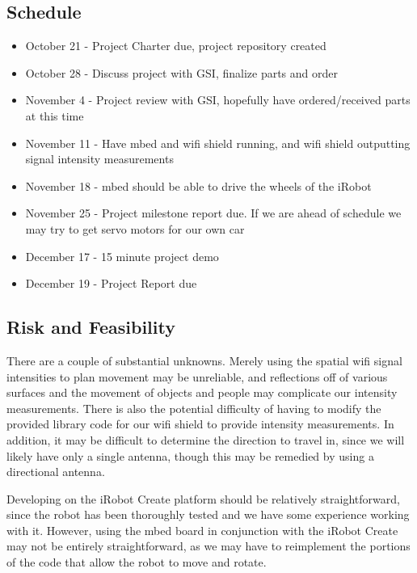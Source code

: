 \documentclass[letterpaper]{article}
\begin{document}
\subsection*{Schedule}

\begin{itemize}
\item October 21 - Project Charter due, project repository created
\item October 28 - Discuss project with GSI, finalize parts and order
\item November 4 - Project review with GSI, hopefully have ordered/received parts at this time
\item November 11 - Have mbed and wifi shield running, and wifi shield outputting signal intensity measurements
\item November 18 - mbed should be able to drive the wheels of the iRobot
\item November 25 - Project milestone report due. If we are ahead of schedule we may try to get servo motors for our own car
\item December 17 - 15 minute project demo
\item December 19 - Project Report due
\end{itemize}

\subsection*{Risk and Feasibility}

There are a couple of substantial unknowns. Merely using the spatial wifi signal intensities to plan movement may be unreliable, and reflections off of various surfaces and the movement of objects and people may complicate our intensity measurements. There is also the potential difficulty of having to modify the provided library code for our wifi shield to provide intensity measurements. In addition, it may be difficult to determine the direction to travel in, since we will likely have only a single antenna, though this may be remedied by using a directional antenna.

Developing on the iRobot Create platform should be relatively straightforward, since the robot has been thoroughly tested and we have some experience working with it. However, using the mbed board in conjunction with the iRobot Create may not be entirely straightforward, as we may have to reimplement the portions of the code that allow the robot to move and rotate.
\end{document}

